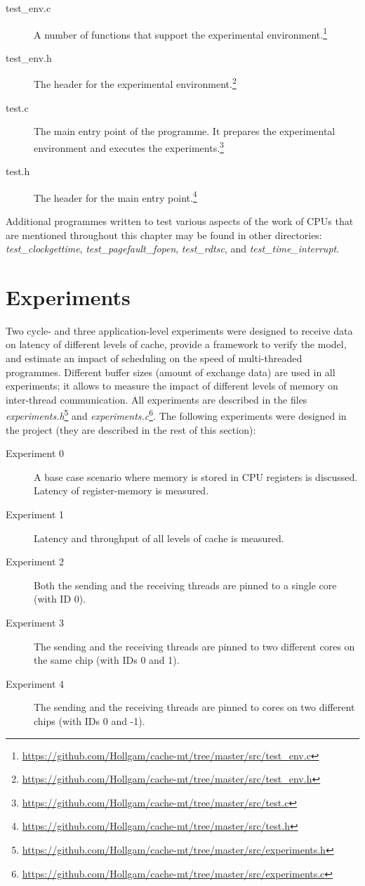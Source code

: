 \begin{description}
  \item[test\_env.c] A number of functions that support the experimental environment.\footnote{\url{https://github.com/Hollgam/cache-mt/tree/master/src/test\_env.c}}
  \item[test\_env.h] The header for the experimental environment.\footnote{\url{https://github.com/Hollgam/cache-mt/tree/master/src/test\_env.h}}
  \item[test.c] The main entry point of the programme. It prepares the experimental environment and executes the experiments.\footnote{\url{https://github.com/Hollgam/cache-mt/tree/master/src/test.c}}
  \item[test.h] The header for the main entry point.\footnote{\url{https://github.com/Hollgam/cache-mt/tree/master/src/test.h}}
\end{description}

Additional programmes written to test various aspects of the work of CPUs that are mentioned throughout this chapter may be found in other directories: \textit{test\_clockgettime}, \textit{test\_pagefault\_fopen}, \textit{test\_rdtsc}, and \textit{test\_time\_interrupt}.

\section{Experiments}
\label{experimentsDesign}

Two cycle- and three application-level experiments were designed to receive data on latency of different levels of cache, provide a framework to verify the model, and estimate an impact of scheduling on the speed of multi-threaded programmes. Different buffer sizes (amount of exchange data) are used in all experiments; it allows to measure the impact of different levels of memory on inter-thread communication. All experiments are described in the files \textit{experiments.h}\footnote{\url{https://github.com/Hollgam/cache-mt/tree/master/src/experiments.h}} and \textit{experiments.c}\footnote{\url{https://github.com/Hollgam/cache-mt/tree/master/src/experiments.c}}. The following experiments were designed in the project (they are described in the rest of this section):

\begin{description}
  \item[Experiment 0] A base case scenario where memory is stored in CPU registers is discussed. Latency of register-memory is measured.
  \item[Experiment 1] Latency and throughput of all levels of cache is measured.
  \item[Experiment 2] Both the sending and the receiving threads are pinned to a single core (with ID 0).
  \item[Experiment 3] The sending and the receiving threads are pinned to two different cores on the same chip (with IDs 0 and 1).
  \item[Experiment 4] The sending and the receiving threads are pinned to cores on two different chips (with IDs 0 and -1).
\end{description}


